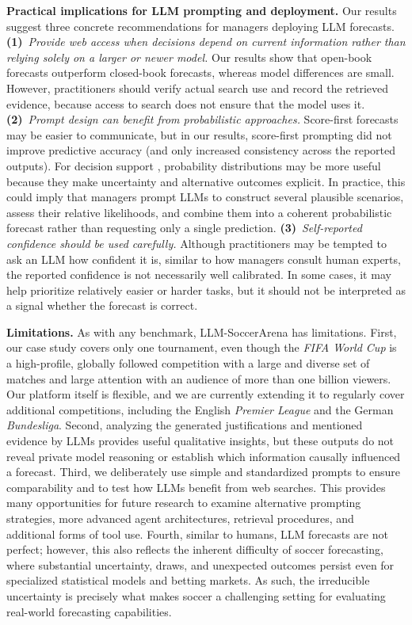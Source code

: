 \documentclass[sigconf,nonacm]{acmart}
\newcommand{\arena}{\mbox{LLM-SoccerArena}\xspace}
\begin{document}
\textbf{Practical implications for LLM prompting and deployment.}
Our results suggest three concrete recommendations for managers deploying LLM forecasts. \textbf{(1)}~\emph{Provide web access when decisions depend on current information rather than relying solely on a larger or newer model.} Our results show that open-book forecasts outperform closed-book forecasts, whereas model differences are small. However, practitioners should verify actual search use and record the retrieved evidence, because access to search does not ensure that the model uses it. \textbf{(2)}~\emph{Prompt design can benefit from probabilistic approaches.}  Score-first forecasts may be easier to communicate, but in our results, score-first prompting did not improve predictive accuracy (and only increased consistency across the reported outputs). For decision support \cite{powerDecisionSupportSystems2002,shimPresentFutureDecision2002}, probability distributions may be more useful because they make uncertainty and alternative outcomes explicit. In practice, this could imply that managers prompt LLMs to construct several plausible scenarios, assess their relative likelihoods, and combine them into a coherent probabilistic forecast rather than requesting only a single prediction. \textbf{(3)}~\emph{Self-reported confidence should be used carefully.} Although practitioners may be tempted to ask an LLM how confident it is, similar to how managers consult human experts, the reported confidence is not necessarily well calibrated. In some cases, it may help prioritize relatively easier or harder tasks, but it should not be interpreted as a signal whether the forecast is correct.

\textbf{Limitations.} As with any benchmark, \arena has limitations. First, our case study covers only one tournament, even though the \emph{FIFA World Cup} is a high-profile, globally followed competition with a large and diverse set of matches and large attention with an audience of more than one billion viewers. Our platform itself is flexible, and we are currently extending it to regularly cover additional competitions, including the English \emph{Premier League} and the German \emph{Bundesliga}. Second, analyzing the generated justifications and mentioned evidence by LLMs provides useful qualitative insights, but these outputs do not reveal private model reasoning or establish which information causally influenced a forecast. Third, we deliberately use simple and standardized prompts to ensure comparability and to test how LLMs benefit from web searches. This provides many opportunities for future research to examine alternative prompting strategies, more advanced agent architectures, retrieval procedures, and additional forms of tool use. Fourth, similar to humans, LLM forecasts are not perfect; however, this also reflects the inherent difficulty of soccer forecasting, where substantial uncertainty, draws, and unexpected outcomes persist even for specialized statistical models and betting markets. As such, the irreducible uncertainty is precisely what makes soccer a challenging setting for evaluating real-world forecasting capabilities.
\end{document}
